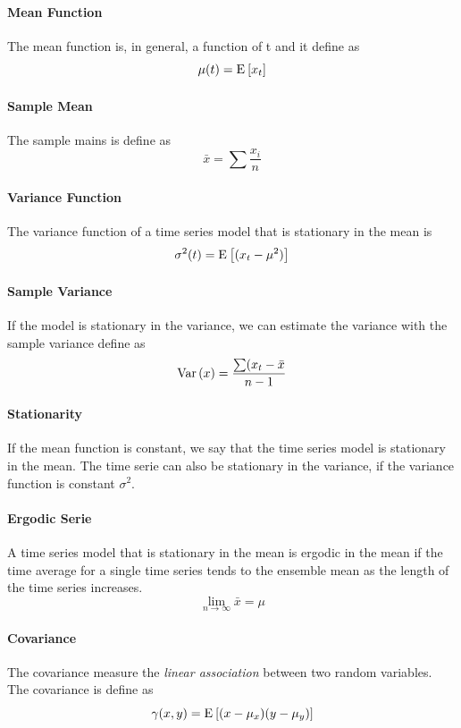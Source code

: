 \paragraph{Mean Function}
The mean function is, in general, a function of t and it define as 
\[\mu(t) = \mathrm{E}_{} \left[ x_t \right] \]

\paragraph{Sample Mean}
The sample mains is define as
\[ \bar{x} = \sum \frac{x_i}{n} \]

\paragraph{Variance Function}
The variance function of a time series model that is stationary in the mean is
\[ \sigma^2(t) = \mathrm{E}_{} \left[ (x_t - \mu^2) \right] \]

\paragraph{Sample Variance}
If the model is stationary in the variance, we can estimate the variance with the sample variance define as
\[ \mathrm{Var} \left( x \right) = \frac{\sum (x_t - \bar{x}}{n-1} \]

\paragraph{Stationarity}
If the mean function is constant, we say that the time series model is stationary in the mean. The time serie can also be stationary in the variance, if the variance function is constant $\sigma^2$.

\paragraph{Ergodic Serie}
A time series model that is stationary in the mean is ergodic in the mean if the time average for a single time series tends to the ensemble mean as the length of the time series increases.
\[ \lim_{n \to \infty} \bar{x} = \mu \]

\paragraph{Covariance}
The covariance measure the \emph{linear association} between two random variables. The covariance is define as
\[ \gamma(x,y) = \mathrm{E}_{} \left[ (x - \mu_x)(y - \mu_y) \right] \]


